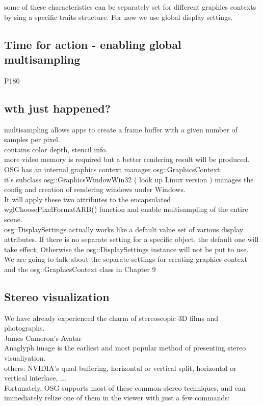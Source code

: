 \documentclass[a4paper,12pt]{book}
\begin{document}
\textrightarrow some of these characteristics can be separately set for different graphics contexts by sing a specific traits structure. For now we use global display settings.

\subsection{Time for action - enabling global multisampling}

P180

\subsection{wth just happened?}
multisampling allows apps to create a frame buffer with a given number of samples per pixel.\\
\textrightarrow contains color depth, stencil info.\\
\textrightarrow more video memory is required but a better rendering result will be produced.\\
OSG has an internal graphics context manager osg::GraphicsContext:\\
\textrightarrow it's subclass osg::GraphicsWindowWin32 ( look up Linux version ) manages the config and creation of rendering windows under Windows.\\
It will apply these two attributes to the encapsulated wglChoosePixelFormatARB() function and enable multisampling of the entire scene.\\
osg::DisplaySettings actually works like a default value set of various display attributes. If there is no separate setting for a specific object, the default one will take effect; Otherwise the osg::DisplaySettings instance will not be put to use.\\
We are going to talk about the separate settings for creating graphics context and the osg::GraphicsContext class in Chapter 9

\subsection{Stereo visualization}
We have already experienced the charm of stereoscopic 3D films and photographs.\\
\textrightarrow James Cameron's Avatar\\
Anaglyph image is the earliest and most popular method of presenting stereo visualiyation. \\
others: NVIDIA's quad-buffering, horizontal or vertical split, horizontal or vertical interlace, ...\\
Fortunately, OSG supports most of these common stereo techniques, and can immediately relize one of them in the viewer with just a few commands:\\
\end{document}
